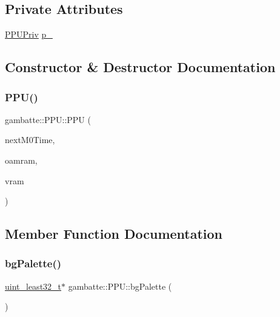 \subsection*{Private Attributes}
\begin{DoxyCompactItemize}
\item 
\hyperlink{structgambatte_1_1PPUPriv}{P\+P\+U\+Priv} \hyperlink{classgambatte_1_1PPU_a125f5c1050b1e30ba0da55dfe1fc121b}{p\+\_\+}
\end{DoxyCompactItemize}


\subsection{Constructor \& Destructor Documentation}
\mbox{\label{classgambatte_1_1PPU_a9bd9298e9039c03f51781751d5651cc5}} 
\subsubsection{\texorpdfstring{P\+P\+U()}{PPU()}}
{\footnotesize\ttfamily gambatte\+::\+P\+P\+U\+::\+P\+PU (\begin{DoxyParamCaption}\item[{\hyperlink{classgambatte_1_1NextM0Time}{Next\+M0\+Time} \&}]{next\+M0\+Time,  }\item[{unsigned char const $\ast$}]{oamram,  }\item[{unsigned char const $\ast$}]{vram }\end{DoxyParamCaption})\hspace{0.3cm}{\ttfamily [inline]}}



\subsection{Member Function Documentation}
\mbox{\label{classgambatte_1_1PPU_ae81c3ac72e66573b86cc35cec0971482}} 
\subsubsection{\texorpdfstring{bg\+Palette()}{bgPalette()}}
{\footnotesize\ttfamily \hyperlink{namespacegambatte_a0639f09fccfbbd5a8e0796318768e370}{uint\+\_\+least32\+\_\+t}$\ast$ gambatte\+::\+P\+P\+U\+::bg\+Palette (\begin{DoxyParamCaption}{ }\end{DoxyParamCaption})\hspace{0.3cm}{\ttfamily [inline]}}

